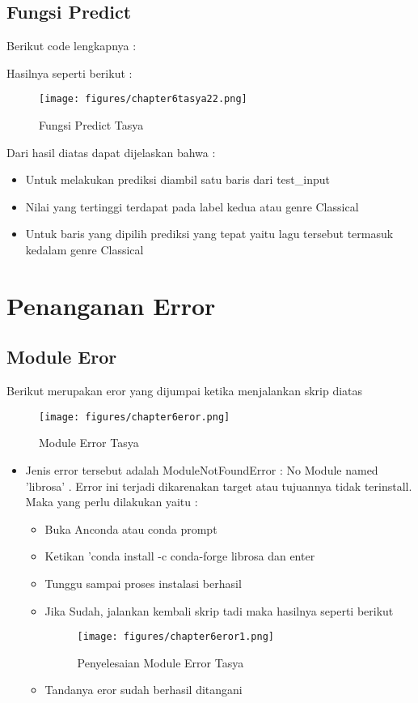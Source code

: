 \subsection{Fungsi Predict}
Berikut code lengkapnya : 

Hasilnya seperti berikut : 
\begin{figure}[ht]
\centering
\texttt{[image: figures/chapter6tasya22.png]}
\caption{Fungsi Predict Tasya}
\label{Praktek}
\end{figure}
Dari hasil diatas dapat dijelaskan bahwa :
\begin{itemize}
\item Untuk melakukan prediksi diambil satu baris dari test\_input
\item Nilai yang tertinggi terdapat pada label kedua atau genre Classical
\item Untuk baris yang dipilih prediksi yang tepat yaitu lagu tersebut termasuk kedalam genre Classical
\end{itemize}

\section{Penanganan Error}
\subsection{Module Eror}
Berikut merupakan eror yang dijumpai ketika menjalankan skrip diatas
\begin{figure}[ht]
\centering
\texttt{[image: figures/chapter6eror.png]}
\caption{Module Error Tasya}
\label{Error}
\end{figure}
\begin{itemize}
\item Jenis error tersebut adalah ModuleNotFoundError : No Module named 'librosa' . Error ini terjadi dikarenakan target atau tujuannya tidak terinstall. Maka yang perlu dilakukan yaitu :
\begin{itemize}
\item Buka Anconda atau conda prompt
\item Ketikan 'conda install -c conda-forge librosa dan enter
\item Tunggu sampai proses instalasi berhasil
\item Jika Sudah, jalankan kembali skrip tadi maka hasilnya seperti berikut
\begin{figure}[ht]
\centering
\texttt{[image: figures/chapter6eror1.png]}
\caption{Penyelesaian Module Error Tasya}
\label{Error}
\end{figure}
\item Tandanya eror sudah berhasil ditangani
\end{itemize}
\end{itemize}






